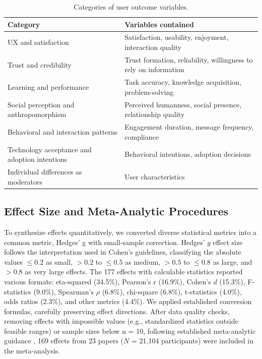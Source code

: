 \documentclass[manuscript,screen,review,anonymous]{acmart}
\DeclareRobustCommand{\change}[1]{%
    \textcolor{changeblue}{#1}%
  }
\DeclareRobustCommand{\change}[1]{#1}
\begin{document}
\begin{table}[h]
\caption{Categories of user outcome variables.}
\label{tab:categories}
\footnotesize
\begin{tabular}{@{}p{}p{}@{}}
\toprule
\textbf{Category} & \textbf{Variables contained} \\
\midrule
UX and satisfaction & Satisfaction, usability, enjoyment, interaction quality \\
\addlinespace
Trust and credibility & Trust formation, reliability, willingness to rely on information \\
\addlinespace
Learning and performance & Task accuracy, knowledge acquisition, problem-solving \\
\addlinespace
Social perception and anthropomorphism & Perceived humanness, social presence, relationship quality \\
\addlinespace
Behavioral and interaction patterns & Engagement duration, message frequency, compliance \\
\addlinespace
Technology acceptance and adoption intentions & Behavioral intentions, adoption decisions \\
\addlinespace
Individual differences as moderators & User characteristics \\
\bottomrule
\end{tabular}
\end{table}



\subsection{Effect Size and Meta-Analytic Procedures}

To synthesize effects quantitatively, we converted diverse statistical metrics into a common metric, Hedges' g with small-sample correction. Hedges' $g$ effect size follows the interpretation used in Cohen's \cite{cohen2013statistical} guidelines, classifying the absolute values $\leq0.2$ as small, $>0.2$ to $\leq0.5$ as medium, $>0.5$ to $\leq0.8$ as large, and $>0.8$ as very large effects. The 177 effects with calculable statistics reported various formats: eta-squared (34.5\%), Pearson's r (16.9\%), Cohen's $d$ (15.3\%), F-statistics (9.0\%), Spearman's $\rho$ (6.8\%), chi-square (6.8\%), t-statistics (4.0\%), odds ratios (2.3\%), and other metrics (4.4\%). We applied established conversion formulas, carefully preserving effect directions. After data quality checks, \change{removing effects with impossible values (e.g., standardized statistics outside feasible ranges) or sample sizes below n = 10, following established meta-analytic guidance \cite{borenstein2010basic}}, 169 effects from 23 papers ($N$ = 21,104 participants) were included in the meta-analysis.
\end{document}
